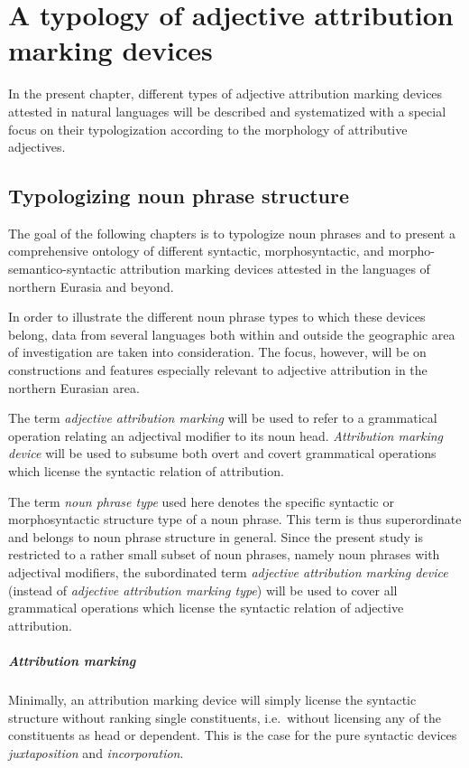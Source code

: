 
\chapter[Typology of attribution marking]{A typology of adjective attribution marking devices} \label{ontology}
In the present chapter, different types of adjective attribution marking devices attested in natural languages will be described and systematized with a special focus on their typologization according to the morphology of attributive adjectives.

\section{Typologizing noun phrase structure}
The goal of the following chapters is to typologize noun phrases and to present a comprehensive ontology of different syntactic, morphosyntactic, and morpho-semantico-syntactic attribution marking devices attested in the languages of northern Eurasia and beyond. 

In order to illustrate the different noun phrase types to which these devices belong, data from several languages both within and outside the geographic area of investigation are taken into consideration. The focus, however, will be on constructions and features especially relevant to adjective attribution in the northern Eurasian area.

The term \emph{adjective attribution marking} will be used to refer to a grammatical operation relating an adjectival modifier to its noun head. \emph{Attribution marking device} will be used to subsume both overt and covert grammatical operations which license the syntactic relation of attribution. 

The term \emph{noun phrase type} used here denotes the specific syntactic or morphosyntactic structure type of a noun phrase. This term is thus superordinate and belongs to noun phrase structure in general. Since the present study is restricted to a rather small subset of noun phrases, namely noun phrases with adjectival modifiers, the subordinated term \emph{adjective attribution marking device} (instead of \emph{adjective attribution marking type}) will be used to cover all grammatical operations which license the syntactic relation of adjective attribution.

\paragraph{Attribution marking} Minimally, an attribution marking device will simply license the syntactic structure without ranking single constituents, i.e.~without licensing any of the constituents as head or dependent. This is the case for the pure syntactic devices \emph{juxtaposition} and \emph{incorporation}.

